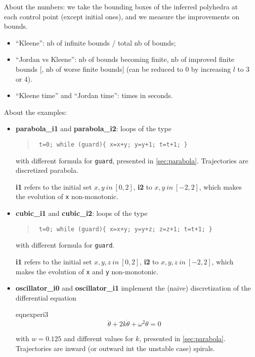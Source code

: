 \documentclass[a4paper,11pt]{article}
\begin{document}
About the numbers: we take the bounding boxes of the inferred
polyhedra at each control point (except initial ones), and we
measure the improvements on bounds.
\begin{itemize}
\item ``Kleene'': nb of infinite bounds / total nb of bounds;
\item ``Jordan vs Kleene'': nb of bounds becoming finite, nb of
  improved finite bounds [, nb of worse finite bounds] (can be
  reduced to 0 by increasing $l$ to $3$ or $4$).
\item ``Kleene time'' and ``Jordan time'': times in seconds.
\end{itemize}

About the examples:
\begin{itemize}
\item \textbf{parabola\_i1} and \textbf{parabola\_i2}: loops of the
  type
  \begin{quote}\tt
    t=0; while (guard)\{ x=x+y; y=y+1; t=t+1; \}
  \end{quote}
  with
  different formula for \texttt{guard}, presented in
  \ref{sec:parabola}. Trajectories are discretized parabola.

  \textbf{i1} refers to the initial set $x,y ~in~ [0,2]$, \textbf{i2}
  to $x,y ~in~ [-2,2]$, which makes the evolution of \texttt{x}
  non-monotonic.
\item \textbf{cubic\_i1} and \textbf{cubic\_i2}: loops of the
  type
  \begin{quote}\tt
    t=0; while (guard)\{ x=x+y; y=y+z; z=z+1; t=t+1; \}
  \end{quote}
  with
  different formula for \texttt{guard}.

  \textbf{i1} refers to the initial set $x,y,z ~in~[0,2]$, \textbf{i2}
  to $x,y,z ~in~[-2,2]$, which makes the evolution of \texttt{x} and \texttt{y}
  non-monotonic.
\item \textbf{oscillator\_i0} and \textbf{oscillator\_i1}
  implement the (naive) discretization of the
  differential equation
  \begin{center}
    \begin{gif}[][130][130]{eqnexperi3}
      $$
      \ddot{\theta} + 2k\dot{\theta} + \omega^2
      \theta=0
      $$
    \end{gif}
  \end{center}
  with $w=0.125$ and different values for $k$, presented in
  \ref{sec:parabola}. Trajectories are inward (or outward int the
  unstable case) spirals.


\end{itemize}
\end{document}

